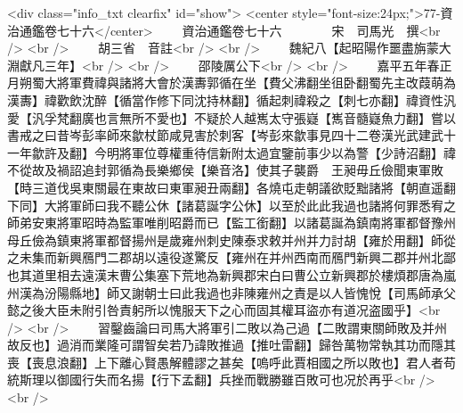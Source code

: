 <div class="info_txt clearfix" id="show">
<center style="font-size:24px;">77-資治通鑑卷七十六</center>
  　　資治通鑑卷七十六　　　　宋　司馬光　撰<br />
<br />
　　胡三省　音註<br />
<br />
　　魏紀八【起昭陽作噩盡旃蒙大淵獻凡三年】<br />
<br />
　　邵陵厲公下<br />
<br />
　　嘉平五年春正月朔蜀大將軍費禕與諸將大會於漢夀郭循在坐【費父沸翻坐徂卧翻蜀先主改葭萌為漢夀】禕歡飲沈醉【循當作修下同沈持林翻】循起刺禕殺之【刺七亦翻】禕資性汎愛【汎孚梵翻廣也言無所不愛也】不疑於人越嶲太守張嶷【嶲音髓嶷魚力翻】嘗以書戒之曰昔岑彭率師來歙杖節咸見害於刺客【岑彭來歙事見四十二卷漢光武建武十一年歙許及翻】今明將軍位尊權重待信新附太過宜鑒前事少以為警【少詩沼翻】禕不從故及禍詔追封郭循為長樂鄉侯【樂音洛】使其子襲爵　王昶毋丘儉聞東軍敗【時三道伐吳東關最在東故曰東軍昶丑兩翻】各燒屯走朝議欲貶黜諸將【朝直遥翻下同】大將軍師曰我不聽公休【諸葛誕字公休】以至於此此我過也諸將何罪悉宥之師弟安東將軍昭時為監軍唯削昭爵而已【監工銜翻】以諸葛誕為鎮南將軍都督豫州母丘儉為鎮東將軍都督揚州是歲雍州刺史陳泰求敕并州并力討胡【雍於用翻】師從之未集而新興鴈門二郡胡以遠役遂驚反【雍州在并州西南而鴈門新興二郡并州北鄙也其道里相去遠漢末曹公集塞下荒地為新興郡宋白曰曹公立新興郡於樓煩郡唐為嵐州漢為汾陽縣地】師又謝朝士曰此我過也非陳雍州之責是以人皆愧悅【司馬師承父懿之後大臣未附引咎責躬所以愧服天下之心而固其權耳盜亦有道况盗國乎】<br />
<br />
　　習鑿齒論曰司馬大將軍引二敗以為己過【二敗謂東關師敗及并州故反也】過消而業隆可謂智矣若乃諱敗推過【推吐雷翻】歸咎萬物常執其功而隱其喪【喪息浪翻】上下離心賢愚解體謬之甚矣【嗚呼此賈相國之所以敗也】君人者苟統斯理以御國行失而名揚【行下孟翻】兵挫而戰勝雖百敗可也况於再乎<br />
<br />
